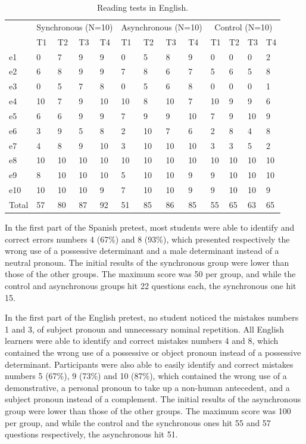 \documentclass{textolivre}
\begin{document}
\begin{table}[htpb]
\caption{Reading tests in English.}
\label{tbl06}
\small
\centering
\begin{tabular}{lllllllllllll}
\toprule
& \multicolumn{4}{c}{Synchronous (N=10)} & \multicolumn{4}{c}{Asynchronous (N=10)} & \multicolumn{4}{c}{Control (N=10)} \\
& T1 & T2 & T3 & T4 & T1 & T2 & T3 & T4 & T1 & T2 & T3 & T4 \\
e1 & 0 & 7 & 9 & 9 & 0 & 5 & 8 & 9 & 0 & 0 & 0 & 2 \\
e2 & 6 & 8 & 9 & 9 & 7 & 8 & 6 & 7 & 5 & 6 & 5 & 8 \\
e3 & 0 & 5 & 7 & 8 & 0 & 5 & 6 & 8 & 0 & 0 & 0 & 1 \\
e4 & 10 & 7 & 9 & 10 & 10 & 8 & 10 & 7 & 10 & 9 & 9 & 6 \\
e5 & 6 & 6 & 9 & 9 & 7 & 9 & 9 & 10 & 7 & 9 & 10 & 9 \\
e6 & 3 & 9 & 5 & 8 & 2 & 10 & 7 & 6 & 2 & 8 & 4 & 8 \\ 
e7 & 4 & 8 & 9 & 10 & 3 & 10 & 10 & 10 & 3 & 3 & 5 & 2 \\
e8 & 10 & 10 & 10 & 10 & 10 & 10 & 10 & 10 & 10 & 10 & 10 & 10 \\
e9 & 8 & 10 & 10 & 10 & 5 & 10 & 10 & 9 & 9 & 10 & 10 & 10 \\
e10 & 10 & 10 & 10 & 9 & 7 & 10 & 10 & 9 & 9 & 10 & 10 & 9 \\
Total & 57 & 80 & 87 & 92 & 51 & 85 & 86 & 85 & 55 & 65 & 63 & 65 \\
\bottomrule
\end{tabular}
\end{table}


In the first part of the Spanish pretest, most students were able to
identify and correct errors numbers 4 (67\%) and 8 (93\%), which
presented respectively the wrong use of a possessive determinant and a
male determinant instead of a neutral pronoun. The initial results of
the synchronous group were lower than those of the other groups. The
maximum score was 50 per group, and while the control and asynchronous
groups hit 22 questions each, the synchronous one hit 15.

In the first part of the English pretest, no student noticed the
mistakes numbers 1 and 3, of subject pronoun and unnecessary nominal
repetition. All English learners were able to identify and correct
mistakes numbers 4 and 8, which contained the wrong use of a possessive
or object pronoun instead of a possessive determinant. Participants were
also able to easily identify and correct mistakes numbers 5 (67\%), 9
(73\%) and 10 (87\%), which contained the wrong use of a demonstrative,
a personal pronoun to take up a non-human antecedent, and a subject
pronoun instead of a complement. The initial results of the asynchronous
group were lower than those of the other groups. The maximum score was
100 per group, and while the control and the synchronous ones hit 55 and
57 questions respectively, the asynchronous hit 51.
\end{document}

